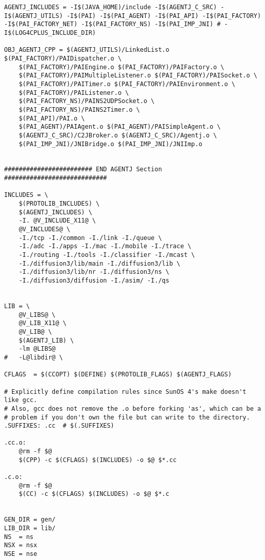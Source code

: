 \begin{verbatim}
AGENTJ_INCLUDES = -I$(JAVA_HOME)/include -I$(AGENTJ_C_SRC) -I$(AGENTJ_UTILS) -I$(PAI) -I$(PAI_AGENT) -I$(PAI_API) -I$(PAI_FACTORY) -I$(PAI_FACTORY_NET) -I$(PAI_FACTORY_NS) -I$(PAI_IMP_JNI) # -I$(LOG4CPLUS_INCLUDE_DIR)

OBJ_AGENTJ_CPP = $(AGENTJ_UTILS)/LinkedList.o $(PAI_FACTORY)/PAIDispatcher.o \
	$(PAI_FACTORY)/PAIEngine.o $(PAI_FACTORY)/PAIFactory.o \
	$(PAI_FACTORY)/PAIMultipleListener.o $(PAI_FACTORY)/PAISocket.o \
	$(PAI_FACTORY)/PAITimer.o $(PAI_FACTORY)/PAIEnvironment.o \
	$(PAI_FACTORY)/PAIListener.o \
	$(PAI_FACTORY_NS)/PAINS2UDPSocket.o \
	$(PAI_FACTORY_NS)/PAINS2Timer.o \
	$(PAI_API)/PAI.o \
	$(PAI_AGENT)/PAIAgent.o $(PAI_AGENT)/PAISimpleAgent.o \
	$(AGENTJ_C_SRC)/C2JBroker.o $(AGENTJ_C_SRC)/Agentj.o \
	$(PAI_IMP_JNI)/JNIBridge.o $(PAI_IMP_JNI)/JNIImp.o


######################## END AGENTJ Section ############################

INCLUDES = \
	$(PROTOLIB_INCLUDES) \
	$(AGENTJ_INCLUDES) \
	-I. @V_INCLUDE_X11@ \
	@V_INCLUDES@ \
	-I./tcp -I./common -I./link -I./queue \
	-I./adc -I./apps -I./mac -I./mobile -I./trace \
	-I./routing -I./tools -I./classifier -I./mcast \
	-I./diffusion3/lib/main -I./diffusion3/lib \
	-I./diffusion3/lib/nr -I./diffusion3/ns \
	-I./diffusion3/diffusion -I./asim/ -I./qs


LIB	= \
	@V_LIBS@ \
	@V_LIB_X11@ \
	@V_LIB@ \
	$(AGENTJ_LIB) \
	-lm @LIBS@
#	-L@libdir@ \

CFLAGS	= $(CCOPT) $(DEFINE) $(PROTOLIB_FLAGS) $(AGENTJ_FLAGS)

# Explicitly define compilation rules since SunOS 4's make doesn't like gcc.
# Also, gcc does not remove the .o before forking 'as', which can be a
# problem if you don't own the file but can write to the directory.
.SUFFIXES: .cc	# $(.SUFFIXES)

.cc.o:
	@rm -f $@
	$(CPP) -c $(CFLAGS) $(INCLUDES) -o $@ $*.cc

.c.o:
	@rm -f $@
	$(CC) -c $(CFLAGS) $(INCLUDES) -o $@ $*.c


GEN_DIR	= gen/
LIB_DIR	= lib/
NS	= ns
NSX	= nsx
NSE	= nse


\end{verbatim}
